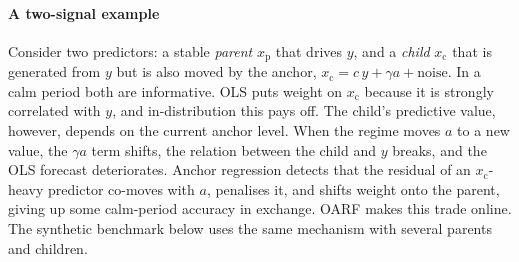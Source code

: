 \documentclass[authoryear,preprint,12pt]{elsarticle}
\theoremstyle{plain}
\theoremstyle{remark}
\newcommand{\OARF}{\textsc{OARF}}
\begin{document}
\paragraph{A two-signal example} Consider two predictors: a stable
\emph{parent} $x_{\mathrm p}$ that drives $y$, and a \emph{child} $x_{\mathrm c}$
that is generated from $y$ but is also moved by the anchor, $x_{\mathrm c}=c\,y+
\gamma a+\text{noise}$. In a calm period both are informative. OLS puts weight on
$x_{\mathrm c}$ because it is strongly correlated with $y$, and in-distribution this
pays off. The child's predictive value, however, depends on the current anchor level.
When the regime moves $a$ to a new value, the $\gamma a$ term shifts, the relation
between the child and $y$ breaks, and the OLS forecast deteriorates. Anchor regression
detects that the residual of an $x_{\mathrm c}$-heavy predictor co-moves with $a$,
penalises it, and shifts weight onto the parent, giving up some calm-period accuracy
in exchange. \OARF{} makes this trade online. The synthetic benchmark below uses the
same mechanism with several parents and children.
\end{document}
